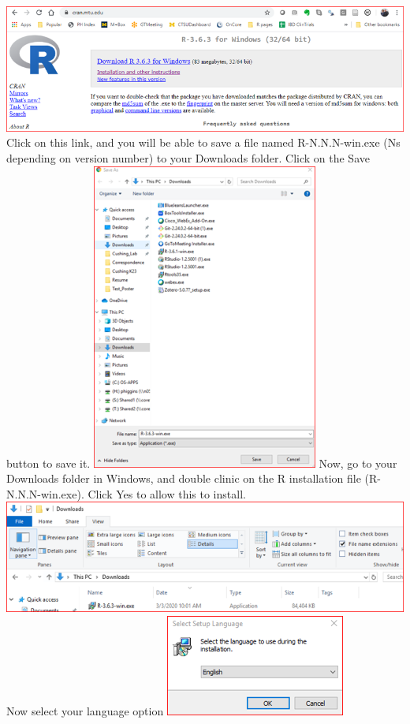 \documentclass[
]{book}
\begin{document}
\includegraphics{images/installr3windows.png}
Click on this link, and you will be able to save a file named R-N.N.N-win.exe (Ns depending on version number) to your Downloads folder. Click on the Save button to save it.
\includegraphics{images/installrsave.png}
Now, go to your Downloads folder in Windows, and double clinic on the R installation file (R-N.N.N-win.exe). Click Yes to allow this to install.
\includegraphics{images/installrexe.png}
Now select your language option
\includegraphics{images/installrEnglish.png}
\end{document}

